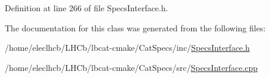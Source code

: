 Definition at line 266 of file Specs\+Interface.\+h.



The documentation for this class was generated from the following files\+:\begin{DoxyCompactItemize}
\item 
/home/eleclhcb/\+L\+H\+Cb/lbcat-\/cmake/\+Cat\+Specs/inc/\hyperlink{SpecsInterface_8h}{Specs\+Interface.\+h}\item 
/home/eleclhcb/\+L\+H\+Cb/lbcat-\/cmake/\+Cat\+Specs/src/\hyperlink{SpecsInterface_8cpp}{Specs\+Interface.\+cpp}\end{DoxyCompactItemize}
